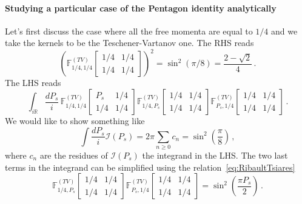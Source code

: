 \documentclass[11pt]{article}
\begin{document}
\paragraph{Studying a particular case of the Pentagon identity analytically}
Let's first discuss the case where all the free momenta are equal to $1/4$ and we take the kernels to be the Teschener-Vartanov one. The RHS reads
\begin{equation}\label{eq:RHSpentagon}
    \left(\mathbb{F}^{(TV)}_{1/4, 1/4} 
    \begin{bmatrix}
     1/4 & 1/4 \\
     1/4 & 1/4
     \end{bmatrix}\right)^2 = \sin^2(\pi/8) = \frac{2-\sqrt{2}}{4}\,.
\end{equation}
The LHS reads
\begin{equation}
    \int_{i\mathbb{R}} \frac{dP_s}{i} \, \mathbb{F}^{(TV)}_{1/4, 1/4} 
    \begin{bmatrix}
     P_s & 1/4 \\
     1/4 & 1/4
     \end{bmatrix}
\mathbb{F}^{(TV)}_{1/4, P_s} 
    \begin{bmatrix}
     1/4 & 1/4 \\
     1/4 & 1/4
     \end{bmatrix}
\mathbb{F}^{(TV)}_{P_s, 1/4} 
    \begin{bmatrix}
     1/4 & 1/4 \\
     1/4 & 1/4
     \end{bmatrix}\,.
\end{equation}
We would like to show something like
\begin{equation}
    \int \frac{dP_s}{i}\mathcal{I}(P_s) = 2\pi \sum_{n\geq 0} c_n = \sin^2\left(\frac{\pi}{8}\right)\,,
\end{equation}
where $c_n$ are the residues of $\mathcal{I}(P_s)$ the integrand in the LHS. The two last terms in the integrand can be simplified using the relation~\eqref{eq:RibaultTsiares}
\begin{equation}\label{eq:intermadiateLHSpentagon}
    \mathbb{F}^{(TV)}_{1/4, P_s} 
    \begin{bmatrix}
     1/4 & 1/4 \\
     1/4 & 1/4
     \end{bmatrix}
\mathbb{F}^{(TV)}_{P_s, 1/4} 
    \begin{bmatrix}
     1/4 & 1/4 \\
     1/4 & 1/4
     \end{bmatrix} = \sin^2\left(\frac{\pi P_s}{2}\right)\,.
\end{equation}
\end{document}
